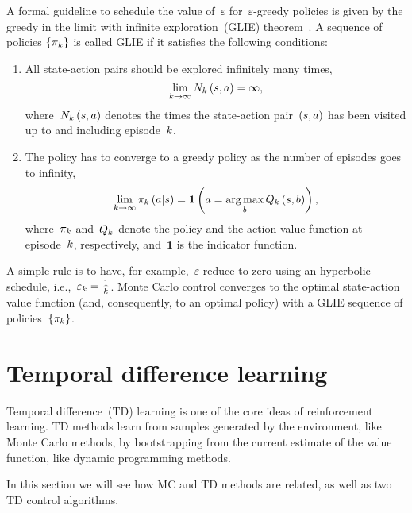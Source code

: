 A formal guideline to schedule the value of~${\varepsilon}$ for~{${\varepsilon}$-greedy} policies is given by the greedy in the limit with infinite exploration~(GLIE) theorem~{\cite{singh2000}}. A sequence of policies ${\left\{\pi_{k}\right\}}$ is called GLIE if it satisfies the following conditions:
\begin{enumerate}
	\item All state-action pairs should be explored infinitely many times,
		\begin{equation}
			\lim_{\indexletter\rightarrow\infty}\timesvisited_{\indexletter}\left(\state,\action\right)=\infty,
		\end{equation}
		where~${\timesvisited_{\indexletter}\left(\state,\action\right)}$ denotes the times the state-action pair~${\left(\state,\action\right)}$ has been visited up to and including episode~${k}$.
	\item The policy has to converge to a greedy policy as the number of episodes goes to infinity,
		\begin{equation}
			\lim_{\indexletter\rightarrow\infty}\policy_{\indexletter}\left(\action\middle\vert\state\right)=\mathbf{1}\left(\action=\argmax_{\varaction}\estimateactionvalue_{\indexletter}\left(\state,\varaction\right)\right),
		\end{equation}
		where~${\pi_{k}}$ and~${\estimateactionvalue_{\indexletter}}$ denote the policy and the action-value function at episode~${k}$, respectively, and~${\mathbf{1}}$ is the indicator function.
\end{enumerate}
A simple rule is to have, for example,~${\varepsilon}$ reduce to zero using an hyperbolic schedule, i.e.,~${\varepsilon_{k}=\frac{1}{k}}$. Monte Carlo control converges to the optimal state-action value function (and, consequently, to an optimal policy) with a GLIE sequence of policies~${\left\{\pi_{k}\right\}}$.

\section{Temporal difference learning}
Temporal difference~(TD) learning is one of the core ideas of reinforcement learning. TD methods learn from samples generated by the environment, like Monte Carlo methods, by bootstrapping from the current estimate of the value function, like dynamic programming methods.

In this section we will see how MC and TD methods are related, as well as two TD control algorithms.

